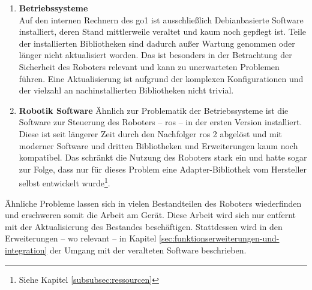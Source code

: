 \begin{enumerate}
    \item \textbf{Betriebssysteme}\\
    Auf den internen Rechnern des \gls{go1} ist ausschließlich Debianbasierte Software installiert, deren Stand mittlerweile
    veraltet und kaum noch gepflegt ist.
    Teile der installierten Bibliotheken sind dadurch außer Wartung genommen oder länger nicht aktualisiert worden.
    Das ist besonders in der Betrachtung der Sicherheit des Roboters relevant und kann zu unerwarteten Problemen führen.
    Eine Aktualisierung ist aufgrund der komplexen Konfigurationen und der vielzahl an nachinstallierten Bibliotheken nicht trivial.
    \item \textbf{Robotik Software}
    Ähnlich zur Problematik der Betriebssysteme ist die Software zur Steuerung des Roboters -- \gls{ros} -- in der ersten
    Version installiert.
    Diese ist seit längerer Zeit durch den Nachfolger \gls{ros} \num{2} abgelöst und mit moderner Software und dritten
    Bibliotheken und Erweiterungen kaum noch kompatibel.
    Das schränkt die Nutzung des Roboters stark ein und hatte sogar zur Folge, dass nur für dieses Problem eine Adapter-Bibliothek
    vom Hersteller selbst entwickelt wurde\footnote{Siehe Kapitel \ref{subsubsec:ressourcen}}.
\end{enumerate}

Ähnliche Probleme lassen sich in vielen Bestandteilen des Roboters wiederfinden und erschweren somit die Arbeit am
Gerät.
Diese Arbeit wird sich nur entfernt mit der Aktualisierung des Bestandes beschäftigen.
Stattdessen wird in den Erweiterungen -- wo relevant -- in Kapitel \ref{sec:funktionserweiterungen-und-integration} der Umgang mit der veralteten Software beschrieben.



